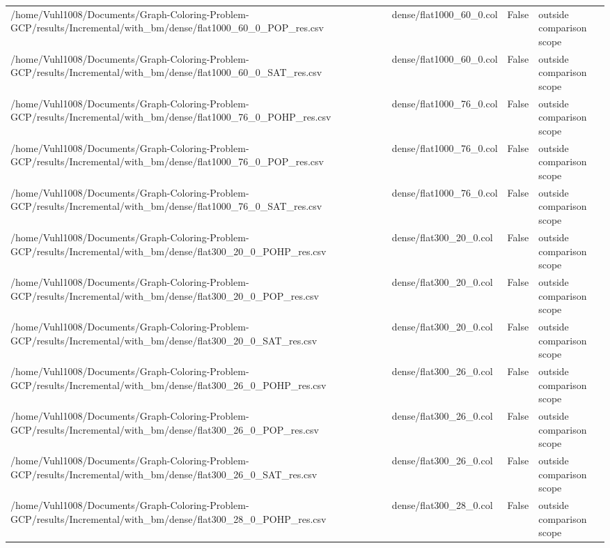\begin{table}[htbp]
\begin{tabular}{llll}
/home/Vuhl1008/Documents/Graph-Coloring-Problem-GCP/results/Incremental/with\_bm/dense/flat1000\_60\_0\_POP\_res.csv & dense/flat1000\_60\_0.col & False & outside comparison scope \\
/home/Vuhl1008/Documents/Graph-Coloring-Problem-GCP/results/Incremental/with\_bm/dense/flat1000\_60\_0\_SAT\_res.csv & dense/flat1000\_60\_0.col & False & outside comparison scope \\
/home/Vuhl1008/Documents/Graph-Coloring-Problem-GCP/results/Incremental/with\_bm/dense/flat1000\_76\_0\_POHP\_res.csv & dense/flat1000\_76\_0.col & False & outside comparison scope \\
/home/Vuhl1008/Documents/Graph-Coloring-Problem-GCP/results/Incremental/with\_bm/dense/flat1000\_76\_0\_POP\_res.csv & dense/flat1000\_76\_0.col & False & outside comparison scope \\
/home/Vuhl1008/Documents/Graph-Coloring-Problem-GCP/results/Incremental/with\_bm/dense/flat1000\_76\_0\_SAT\_res.csv & dense/flat1000\_76\_0.col & False & outside comparison scope \\
/home/Vuhl1008/Documents/Graph-Coloring-Problem-GCP/results/Incremental/with\_bm/dense/flat300\_20\_0\_POHP\_res.csv & dense/flat300\_20\_0.col & False & outside comparison scope \\
/home/Vuhl1008/Documents/Graph-Coloring-Problem-GCP/results/Incremental/with\_bm/dense/flat300\_20\_0\_POP\_res.csv & dense/flat300\_20\_0.col & False & outside comparison scope \\
/home/Vuhl1008/Documents/Graph-Coloring-Problem-GCP/results/Incremental/with\_bm/dense/flat300\_20\_0\_SAT\_res.csv & dense/flat300\_20\_0.col & False & outside comparison scope \\
/home/Vuhl1008/Documents/Graph-Coloring-Problem-GCP/results/Incremental/with\_bm/dense/flat300\_26\_0\_POHP\_res.csv & dense/flat300\_26\_0.col & False & outside comparison scope \\
/home/Vuhl1008/Documents/Graph-Coloring-Problem-GCP/results/Incremental/with\_bm/dense/flat300\_26\_0\_POP\_res.csv & dense/flat300\_26\_0.col & False & outside comparison scope \\
/home/Vuhl1008/Documents/Graph-Coloring-Problem-GCP/results/Incremental/with\_bm/dense/flat300\_26\_0\_SAT\_res.csv & dense/flat300\_26\_0.col & False & outside comparison scope \\
/home/Vuhl1008/Documents/Graph-Coloring-Problem-GCP/results/Incremental/with\_bm/dense/flat300\_28\_0\_POHP\_res.csv & dense/flat300\_28\_0.col & False & outside comparison scope \\

\end{tabular}
\end{table}

